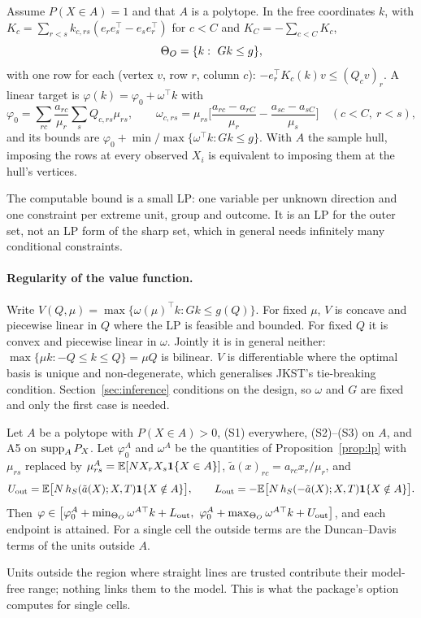 \begin{proposition}\label{prop:lp}
Assume $P(X\in A)=1$ and that $A$ is a polytope. In the free coordinates $k$,
with $K_c=\sum_{r<s}k_{c,rs}(e_re_s^\top-e_se_r^\top)$ for $c<C$ and
$K_C=-\sum_{c<C}K_c$,
\[
\Theta_O=\{k:\ Gk\le g\},
\]
with one row for each (vertex $v$, row $r$, column $c$): $-e_r^\top K_c(k)v\le(Q_cv)_r$.
A linear target is $\varphi(k)=\varphi_0+\omega^\top k$ with
\[
\varphi_0=\sum_{rc}\frac{a_{rc}}{\mu_r}\sum_sQ_{c,rs}\mu_{rs},\qquad
\omega_{c,rs}=\mu_{rs}\Big[\frac{a_{rc}-a_{rC}}{\mu_r}-\frac{a_{sc}-a_{sC}}{\mu_s}\Big]\quad(c<C,\ r<s),
\]
and its bounds are $\varphi_0+\min/\max\{\omega^\top k:Gk\le g\}$. With $A$ the
sample hull, imposing the rows at every observed $X_i$ is equivalent to imposing
them at the hull's vertices.
\end{proposition}
\begin{reading}
The computable bound is a small LP: one variable per unknown direction and one
constraint per extreme unit, group and outcome. It is an LP for the outer set,
not an LP form of the sharp set, which in general needs infinitely many
conditional constraints.
\end{reading}

\paragraph{Regularity of the value function.} Write
$V(Q,\mu)=\max\{\omega(\mu)^\top k:Gk\le g(Q)\}$. For fixed $\mu$, $V$ is concave
and piecewise linear in $Q$ where the LP is feasible and bounded. For fixed $Q$
it is convex and piecewise linear in $\omega$. Jointly it is in general neither:
$\max\{\mu k:-Q\le k\le Q\}=\mu Q$ is bilinear. $V$ is differentiable where the
optimal basis is unique and non-degenerate, which generalises JKST's
tie-breaking condition. Section~\ref{sec:inference} conditions on the design, so
$\omega$ and $G$ are fixed and only the first case is needed.

\begin{proposition}\label{prop:trim}
Let $A$ be a polytope with $P(X\in A)>0$, (S1) everywhere, (S2)--(S3) on $A$,
and A5 on $\operatorname{supp}_AP_X$. Let $\varphi^A_0$ and $\omega^A$ be the quantities of
Proposition~\ref{prop:lp} with $\mu_{rs}$ replaced by $\mu^A_{rs}=\mathbb E[NX_rX_s\mathbf 1\{X\in A\}]$,
$\tilde a(x)_{rc}=a_{rc}x_r/\mu_r$, and
\[
U_{\rm out}=\mathbb E\big[N\,h_S(\tilde a(X);X,T)\mathbf 1\{X\notin A\}\big],\qquad
L_{\rm out}=-\mathbb E\big[N\,h_S(-\tilde a(X);X,T)\mathbf 1\{X\notin A\}\big].
\]
Then $\varphi\in\big[\varphi^A_0+\min_{\Theta_O}\omega^{A\top}k+L_{\rm out},\
\varphi^A_0+\max_{\Theta_O}\omega^{A\top}k+U_{\rm out}\big]$, and each endpoint is
attained. For a single cell the outside terms are the Duncan--Davis terms of the
units outside $A$.
\end{proposition}
\begin{reading}
Units outside the region where straight lines are trusted contribute their
model-free range; nothing links them to the model. This is what the package's
\code{range = "trim"} option computes for single cells.
\end{reading}

